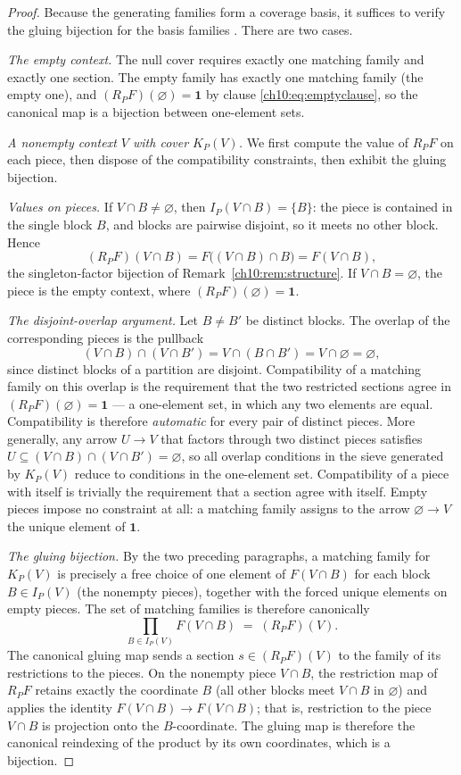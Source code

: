 \begin{proof}
Because the generating families form a coverage basis, it suffices to verify
the gluing bijection for the basis families \cite{stacks00ZC}. There are two
cases.

\emph{The empty context.} The null cover requires exactly one matching family
and exactly one section. The empty family has exactly one matching family (the
empty one), and $(R_P F)(\varnothing) = \mathbf{1}$ by clause
\eqref{ch10:eq:emptyclause}, so the canonical map is a bijection between
one-element sets.

\emph{A nonempty context $V$ with cover $K_P(V)$.} We first compute the value
of $R_P F$ on each piece, then dispose of the compatibility constraints, then
exhibit the gluing bijection.

\emph{Values on pieces.} If $V \cap B \neq \varnothing$, then
$I_P(V \cap B) = \{B\}$: the piece is contained in the single block $B$, and
blocks are pairwise disjoint, so it meets no other block. Hence
\[
(R_P F)(V \cap B) = F\bigl((V \cap B) \cap B\bigr) = F(V \cap B),
\]
the singleton-factor bijection of Remark~\ref{ch10:rem:structure}. If
$V \cap B = \varnothing$, the piece is the empty context, where
$(R_P F)(\varnothing) = \mathbf{1}$.

\emph{The disjoint-overlap argument.} Let $B \neq B'$ be distinct blocks. The
overlap of the corresponding pieces is the pullback
\[
(V \cap B) \cap (V \cap B') = V \cap (B \cap B') = V \cap \varnothing
= \varnothing,
\]
since distinct blocks of a partition are disjoint. Compatibility of a matching
family on this overlap is the requirement that the two restricted sections
agree in $(R_P F)(\varnothing) = \mathbf{1}$ --- a one-element set, in which
any two elements are equal. Compatibility is therefore \emph{automatic} for
every pair of distinct pieces. More generally, any arrow $U \to V$ that
factors through two distinct pieces satisfies
$U \subseteq (V \cap B) \cap (V \cap B') = \varnothing$, so all overlap
conditions in the sieve generated by $K_P(V)$ reduce to conditions in the
one-element set. Compatibility of a piece with itself is trivially the
requirement that a section agree with itself. Empty pieces impose no
constraint at all: a matching family assigns to the arrow
$\varnothing \to V$ the unique element of $\mathbf{1}$.

\emph{The gluing bijection.} By the two preceding paragraphs, a matching
family for $K_P(V)$ is precisely a free choice of one element of
$F(V \cap B)$ for each block $B \in I_P(V)$ (the nonempty pieces), together
with the forced unique elements on empty pieces. The set of matching families
is therefore canonically
\[
\prod_{B \in I_P(V)} F(V \cap B) \;=\; (R_P F)(V).
\]
The canonical gluing map sends a section $s \in (R_P F)(V)$ to the family of
its restrictions to the pieces. On the nonempty piece $V \cap B$, the
restriction map of $R_P F$ retains exactly the coordinate $B$ (all other
blocks meet $V \cap B$ in $\varnothing$) and applies the identity
$F(V \cap B) \to F(V \cap B)$; that is, restriction to the piece $V \cap B$
is projection onto the $B$-coordinate. The gluing map is therefore the
canonical reindexing of the product by its own coordinates, which is a
bijection.
\end{proof}

